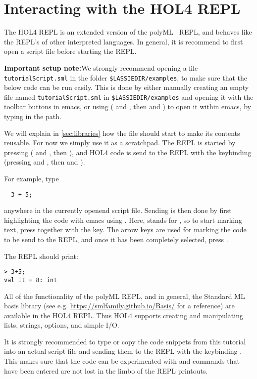 \section{Interacting with the HOL4 REPL}

The HOL4 REPL is an extended version of the polyML~\cite{polymlweb} REPL, and
behaves like the REPL's of other interpreted languages.
In general, it is recommend to first open a script file before starting
the REPL.

\textbf{Important setup note:}We strongly recommend opening a file
\texttt{tutorialScript.sml} in the folder \texttt{\$LASSIEDIR/examples}, to make
sure that the below code can be run easily.
This is done by either manually creating an empty file named \texttt{tutorialScript.sml} in \texttt{\$LASSIEDIR/examples}
and opening it with the toolbar buttons in emacs, or using  ( and , then  and )
to open it within emacs, by typing in the path.

We will explain in \autoref{sec:libraries} how the file should start to make its
contents reusable. For now we simply use it as a scratchpad.
The REPL is started by pressing  ( and , then ),
and HOL4 code is send to the REPL with the keybinding 
(pressing  and , then  and ).

For example, type
\begin{lstlisting}
  3 + 5;
\end{lstlisting}

anywhere in the currently openend script file.
Sending is then done by first highlighting the code with emacs using .
Here,  stands for , so to start marking text, press
 together with the  key.
The arrow keys are used for marking the code to be send to the REPL, and once it
has been completely selected, press .

The REPL should print:
\begin{lstlisting}[frame=single]
> 3+5;
val it = 8: int
\end{lstlisting}

All of the functionality of the polyML REPL, and in general, the Standard ML
basis library (see e.g. \url{https://smlfamily.github.io/Basis/} for a reference)
are available in the HOL4 REPL.
Thus HOL4 supports creating and manipulating lists, strings, options, and
simple I/O.

It is strongly recommended to type or copy the code snippets from this tutorial
into an actual script file and sending them to the REPL with the keybinding .
This makes sure that the code can be experimented with and commands that have
been entered are not lost in the limbo of the REPL printouts.

